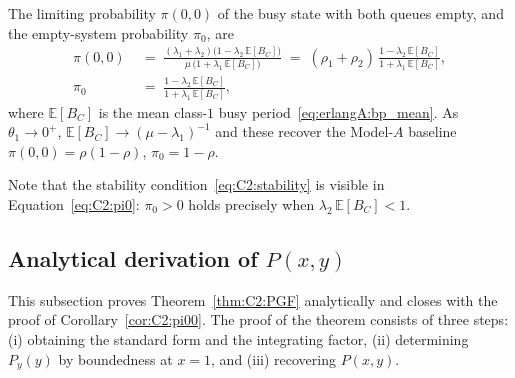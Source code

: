 \begin{corollary}\label{cor:C2:pi00}
    The limiting probability $\pi(0,0)$ of the busy state with both queues empty, and the empty-system probability $\pi_0$, are
    \begin{align}
        \pi(0,0) \;&=\; \frac{(\lambda_1+\lambda_2)\bigl(1 - \lambda_2\,\mathbb{E}[B_C]\bigr)}{\mu\,\bigl(1 + \lambda_1\,\mathbb{E}[B_C]\bigr)} \;=\; (\rho_1+\rho_2)\,\frac{1 - \lambda_2\,\mathbb{E}[B_C]}{1 + \lambda_1\,\mathbb{E}[B_C]}, \label{eq:C2:pi00}\\[4pt]
        \pi_0 \;&=\; \frac{1 - \lambda_2\,\mathbb{E}[B_C]}{1 + \lambda_1\,\mathbb{E}[B_C]}, \label{eq:C2:pi0}
    \end{align}
    where $\mathbb{E}[B_C]$ is the mean class-$1$ busy period~\eqref{eq:erlangA:bp_mean}. As $\theta_1\to 0^+$, $\mathbb{E}[B_C]\to (\mu-\lambda_1)^{-1}$ and these recover the Model-$A$ baseline $\pi(0,0) = \rho(1-\rho)$, $\pi_0 = 1-\rho$.
\end{corollary}
Note that the stability condition~\eqref{eq:C2:stability} is visible in Equation~\eqref{eq:C2:pi0}: $\pi_0>0$ holds precisely when $\lambda_2\,\mathbb{E}[B_C]<1$.

\subsection{Analytical derivation of \texorpdfstring{$P(x,y)$}{P(x,y)}}\label{ssec:C2:proof}

This subsection proves Theorem~\ref{thm:C2:PGF} analytically and closes with the proof of Corollary~\ref{cor:C2:pi00}. The proof of the theorem consists of three steps: (i) obtaining the standard form and the integrating factor, (ii) determining $P_y(y)$ by boundedness at $x=1$, and (iii) recovering $P(x,y)$.

